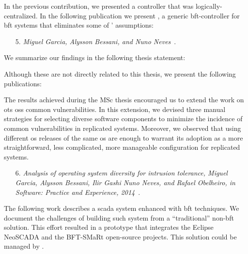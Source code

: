 In the previous contribution, we presented a controller that was logically-centralized. 
In the following publication we present \controller, a generic \gls{bft}-controller for \gls{bft} systems that eliminates some of \system' assumptions:


\begin{enumerate}

\item[5.] \emph{\controller Miguel Garcia, Alysson Bessani, and Nuno Neves}~\cite{}.

\end{enumerate}

We summarize our findings in the following thesis statement:


\vspace{2mm}


Although these are not directly related to this thesis, we present the following publications:

The results achieved during the MSc thesis encouraged us to extend the work on \gls{ots} \glspl{os} common vulnerabilities.
In this extension, we devised three manual strategies for selecting diverse software components to minimize the incidence of common vulnerabilities in replicated systems.
Moreover, we observed that using different \gls{os} releases of the same \gls{os} are enough to warrant its adoption as a more straightforward, less complicated, more manageable configuration for replicated systems.

\begin{enumerate}
\item[6.] \emph{Analysis of operating system diversity for intrusion tolerance, Miguel Garcia, Alysson Bessani, Ilir Gashi Nuno Neves, and Rafael Obelheiro, in Software: Practice and Experience, 2014}~\cite{Garcia:2014}.
\end{enumerate}


The following work describes a \gls{scada} system enhanced with \gls{bft} techniques.
We document the challenges of building such system from a ``traditional'' non-\gls{bft} solution.
This effort resulted in a prototype that integrates the Eclipse NeoSCADA and the BFT-SMaRt open-source projects.
This solution could be managed by \system.

